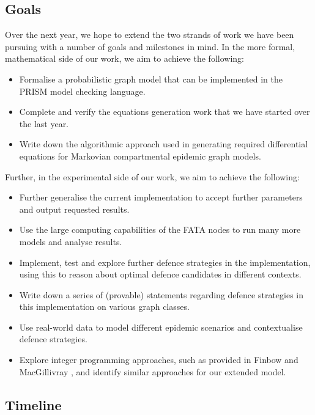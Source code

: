 \documentclass[../report.tex]{subfiles}
\begin{document}
\subsection{Goals}

Over the next year, we hope to extend the two strands of work we have been pursuing with a number of goals and milestones in mind. In the more formal, mathematical side of our work, we aim to achieve the following:
\begin{itemize}
	\item Formalise a probabilistic graph model that can be implemented in the PRISM model checking language.
	\item Complete and verify the equations generation work that we have started over the last year. 
	\item Write down the algorithmic approach used in generating required differential equations for Markovian compartmental epidemic graph models.
\end{itemize}

Further, in the experimental side of our work, we aim to achieve the following:
\begin{itemize}
	\item Further generalise the current implementation to accept further parameters and output requested results.
	\item Use the large computing capabilities of the FATA nodes to run many more models and analyse results.
	\item Implement, test and explore further defence strategies in the implementation, using this to reason about optimal defence candidates in different contexts.
	\item Write down a series of (provable) statements regarding defence strategies in this implementation on various graph classes.
	\item Use real-world data to model different epidemic scenarios and contextualise defence strategies.
	\item Explore integer programming approaches, such as provided in Finbow and MacGillivray \cite{finbow_2009}, and identify similar approaches for our extended model.
\end{itemize}

\subsection{Timeline}
\end{document}
